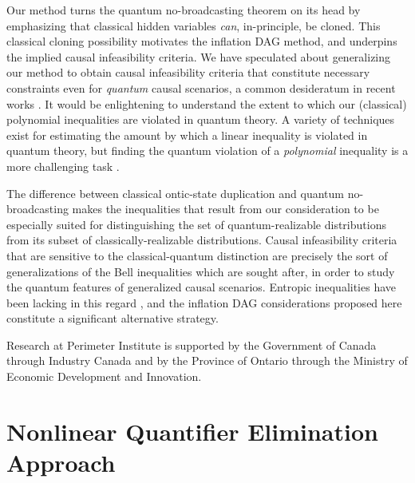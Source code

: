 Our method turns the quantum no-broadcasting theorem \cite{NoCloningQuantum1996,NoCloningGeneral2006} on its head by emphasizing that classical hidden variables \emph{can}, in-principle, be cloned. This classical cloning possibility motivates the inflation DAG method, and underpins the implied causal infeasibility criteria. We have speculated about generalizing our method to obtain causal infeasibility criteria that constitute necessary constraints even for \emph{quantum} causal scenarios, a common desideratum in recent works \cite{fritz2012bell,pusey2014gdag,Chaves2015infoquantum,ChavesNoSignalling,BeyondBellII}. It would be enlightening to understand the extent to which our (classical) polynomial inequalities are violated in quantum theory. A variety of techniques exist for estimating the amount by which a linear inequality \cite{NPA2008Long,I3322NPA1} is violated in quantum theory, but finding the quantum violation of a \emph{polynomial} inequality is a more challenging task \cite{NPAReview}.

The difference between classical ontic-state duplication and quantum no-broadcasting makes the inequalities that result from our consideration to be especially suited for distinguishing the set of quantum-realizable distributions from its subset of classically-realizable distributions. Causal infeasibility criteria that are sensitive to the classical-quantum distinction are precisely the sort of generalizations of the Bell inequalities which are sought after, in order to study the quantum features of generalized causal scenarios. Entropic inequalities have been lacking in this regard \cite{fritz2012bell,pusey2014gdag,Chaves2015infoquantum}, and the inflation DAG considerations proposed here constitute a significant alternative strategy.





\begin{acknowledgments}
Research at Perimeter Institute is supported by the Government of Canada through Industry Canada and by the Province of Ontario through the Ministry of Economic Development and Innovation.
\end{acknowledgments}


\onecolumngrid
\appendix
\renewcommand{\theequation}{A-\arabic{equation}}
\setcounter{equation}{0}

\section{Nonlinear Quantifier Elimination Approach}\label{sec:nonlinearelimination}





